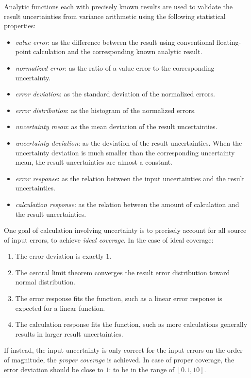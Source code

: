 \documentclass[twoside]{article}
\numberwithin{equation}{section}
\begin{document}
Analytic functions each with precisely known results are used to validate the result uncertainties from variance arithmetic using the following statistical properties: 
\begin{itemize}

\item \emph{value error}: as the difference between the result using conventional floating-point calculation and the corresponding known analytic result.

\item \emph{normalized error}: as the ratio of a value error to the corresponding uncertainty.

\item \emph{error deviation}: as the standard deviation of the normalized errors.

\item \emph{error distribution}: as the histogram of the normalized errors.

\item \emph{uncertainty mean}: as the mean deviation of the result uncertainties.

\item \emph{uncertainty deviation}: as the deviation of the result uncertainties.
When the uncertainty deviation is much smaller than the corresponding uncertainty mean, the result uncertainties are almost a constant.

\item \emph{error response}: as the relation between the input uncertainties and the result uncertainties.

\item \emph{calculation response}: as the relation between the amount of calculation and the result uncertainties.

\end{itemize}

One goal of calculation involving uncertainty is to precisely account for all source of input errors, to achieve \emph{ideal coverage}.
In the case of ideal coverage:
\begin{enumerate}
\item The error deviation is exactly $1$.

\item The central limit theorem converges the result error distribution toward normal distribution.

\item The error response fits the function, such as a linear error response is expected for a linear function.

\item The calculation response fits the function, such as more calculations generally results in larger result uncertainties.
\end{enumerate}
If instead, the input uncertainty is only correct for the input errors on the order of magnitude, the \emph{proper coverage} is achieved.
In case of proper coverage, the error deviation should be close to $1$: to be in the range of $[0.1, 10]$.
\end{document}

